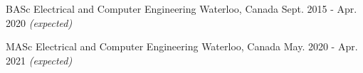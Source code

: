 



\begin{cvhonors}


\cvhonor
{BASc} %
{Electrical and Computer Engineering} %
{Waterloo, Canada} %
{Sept. 2015 - Apr. 2020 \emph{(expected)}} %


\cvhonor
{MASc} %
{Electrical and Computer Engineering} %
{Waterloo, Canada} %
{May. 2020 - Apr. 2021 \emph{(expected)}} %

\end{cvhonors}